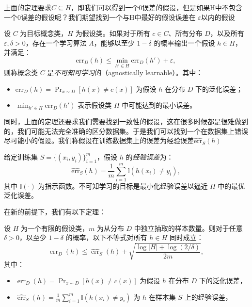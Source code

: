 \documentclass[lang=cn,newtx,10pt,scheme=chinese,chinesefont=nofont,citestyle=gb7714-2015, bibstyle=gb7714-2015]{elegantbook}
\begin{document}
\begin{refsection}
上面的定理要求\( C \subseteq H \)，即我们可以得到一个0误差的假设，但是如果H中不包含一个0误差的假设呢？我们期望找到一个与H中最好的假设误差在 \( \varepsilon \)以内的假设
\begin{definition}
    设 \( C \) 为目标概念类，\( H \) 为假设类。如果对于所有 \( c \in C \)、所有分布 \( D \)，以及所有 \( \varepsilon, \delta > 0 \)，存在一个学习算法 \( A \)，能够以至少 \( 1 - \delta \) 的概率输出一个假设 \( h \in H \)，并满足：
    \[
    \text{err}_{D}(h) \leq \min_{h' \in H} \text{err}_{D}(h') + \varepsilon,
    \]
    则称概念类 \( C \) 是\emph{不可知可学习}的（agnostically learnable）。其中：
    \begin{itemize}
        \item \(\text{err}_{D}(h) = \Pr_{x \sim D}[h(x) \neq c(x)]\) 为假设 \( h \) 在分布 \( D \) 下的泛化误差；
        \item \(\min_{h' \in H} \text{err}_{D}(h')\) 表示假设类 \( H \) 中可能达到的最小误差。
    \end{itemize}
\end{definition}
同时，上面的定理还要求我们需要找到一致性的假设，这在很多时候都是很难做到的，我们可能无法完全准确的区分数据集。于是我们可以找到一个在数据集上错误尽可能小的假设。我们称假设在训练数据集上的误差为经验误差$\widehat{\text{err}}_{S}(h)$
\begin{definition}
    给定训练集 \( S = \{(x_i, y_i)\}_{i=1}^m \)，假设 \( h \) 的\emph{经验误差}为：
    \[
    \widehat{\text{err}}_{S}(h) = \frac{1}{m} \sum_{i=1}^m \mathbb{I}(h(x_i) \neq y_i),
    \]
    其中 \( \mathbb{I}(\cdot) \) 为指示函数。不可知学习的目标是最小化经验误差以逼近 \( H \) 中的最优泛化误差。
\end{definition}
在新的前提下，我们有以下定理：
\begin{theorem}[有限假设类的泛化误差界]
设 \( H \) 为一个有限的假设类，\( m \) 为从分布 \( D \) 中独立抽取的样本数量。则对于任意 \( \delta > 0 \)，以至少 \( 1 - \delta \) 的概率，以下不等式对所有 \( h \in H \) 同时成立：
\[
\operatorname{err}_D(h) \leq \widehat{\operatorname{err}}_S(h) + \sqrt{\frac{\log |H| + \log(2/\delta)}{2m}},
\]
其中：
\begin{itemize}
    \item \( \operatorname{err}_D(h) = \Pr_{x \sim D}[h(x) \neq c(x)] \) 为假设 \( h \) 在分布 \( D \) 下的泛化误差，
    \item \( \widehat{\operatorname{err}}_S(h) = \frac{1}{m} \sum_{i=1}^m \mathbb{I}(h(x_i) \neq y_i) \) 为 \( h \) 在样本集 \( S \) 上的经验误差，

\end{itemize}
\end{theorem}
\end{refsection}
\end{document}
